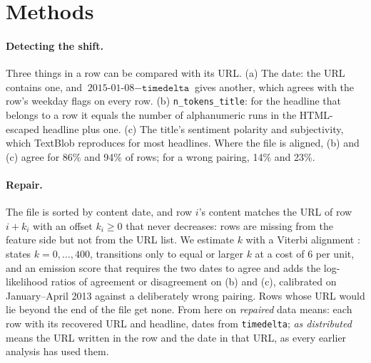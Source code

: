 \documentclass[10pt,a4paper,twocolumn]{article}
\begin{document}
\section{Methods}
\label{sec:method}
\paragraph{Detecting the shift.} Three things in a row can be compared with its URL. (a) The date: the URL
contains one, and $\text{2015-01-08}-\texttt{timedelta}$ gives another, which agrees with the row's weekday
flags on every row. (b) \texttt{n\_tokens\_title}: for the headline that belongs to a row it equals the number
of alphanumeric runs in the HTML-escaped headline plus one. (c) The title's sentiment polarity and
subjectivity, which TextBlob reproduces for most headlines. Where the file is aligned, (b) and (c) agree for
86\% and 94\% of rows; for a wrong pairing, 14\% and 23\%.

\paragraph{Repair.} The file is sorted by content date, and row $i$'s content matches the URL of row $i+k_i$
with an offset $k_i\ge 0$ that never decreases: rows are missing from the feature side but not from the URL
list. We estimate $k$ with a Viterbi alignment \citep{viterbi1967}: states $k=0,\dots,400$, transitions only
to equal or larger $k$ at a cost of 6 per unit, and an emission score that requires the two dates to agree and
adds the log-likelihood ratios of agreement or disagreement on (b) and (c), calibrated on January--April 2013
against a deliberately wrong pairing. Rows whose URL would lie beyond the end of the file get none. From here on
\emph{repaired} data means: each row with its recovered URL and headline, dates from \texttt{timedelta}; \emph{as
distributed} means the URL written in the row and the date in that URL, as every earlier analysis has used them.
\end{document}

